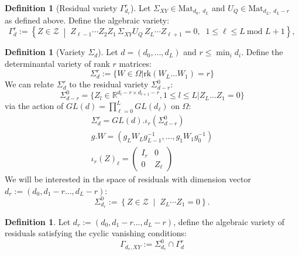 \documentclass{article}
\theoremstyle{definition}
\newtheorem{definition}[theorem]{Definition}
\begin{document}
\begin{definition}[Residual variety $\Gamma_{d_r}^r$]
Let $\Sigma_{XY} \in \mathrm{Mat}_{d_0,\; d_L}$ and $U_Q \in \mathrm{Mat}_{d_L,\; d_L - r}$ as defined above. Define the algebraic variety:
\[
\Gamma_d^r
:=
\left\{
Z \in \mathcal Z
\;\middle|\;
Z_{\ell-1}\cdots Z_2 Z_1 \,\Sigma_{XY} U_Q\, Z_L \cdots Z_{\ell+1} = 0,
\;\; 1 \le \ell \le L \ \text{mod } L+1
\right\},
\]
\end{definition}
\begin{definition}[Variety $\Sigma_d$] Let $d=(d_0,\dots,d_L)$ and $r\le \min_i d_i$. Define the determinantal variety of rank $r$ matrices:
\begin{equation*}
    \Sigma_{d}^r := \{W\in\Omega| \text{rk}(W_L...W_1) = r\}
\end{equation*}
We can relate $\Sigma_{d}^r$ to the residual variety $\Sigma_{d-r}^0$:
\begin{equation*}
    \Sigma_{d-r}^0 = \{Z_l\in\mathbb{R}^{d_l-r\times d_{l+1}-r}, 1\leq l \leq L| Z_L...Z_1 = 0\}
\end{equation*}
via the action of $GL(d) = \prod_{\ell=0}^L GL(d_{\ell})$ on $\Omega$:
\begin{align*}
    \Sigma_{d}^r = GL(d).\iota_r(\Sigma_{d-r}^0) \\
    g.W = (g_L W_L g_{L-1}^{-1}, \dots, g_1 W_1 g_0^{-1}) \\
    \iota_r(Z)_\ell = \begin{pmatrix} I_r & 0 \\ 0 & Z_\ell \end{pmatrix}
\end{align*}
We will be interested in the space of residuals with dimension vector $d_r:=(d_0, d_1-r\dots,d_L-r)$:
\[
\Sigma^0_{d_r}
:=
\left\{
Z\in \mathcal Z
\;\middle|\;
Z_L\cdots Z_1=0
\right\}.
\]
\end{definition}
\begin{definition}
Let $d_r:=(d_0, d_1-r\dots,d_L-r)$, define the algebraic variety of residuals satisfying the cyclic vanishing conditions:
\[
\Gamma_{d_r,XY}:= \Sigma^0_{d_r}\cap\Gamma_{d}^r
\]
\end{definition}
\end{document}
